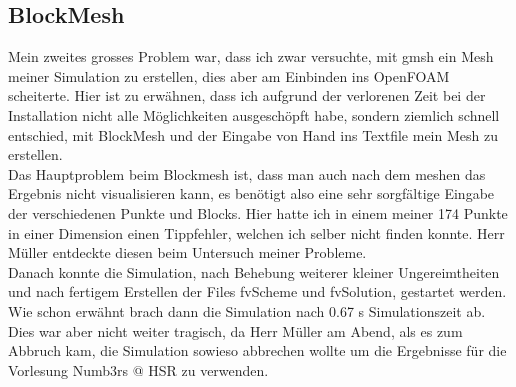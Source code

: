 \begin{refsection}
\subsection{BlockMesh}
Mein zweites grosses Problem war, dass ich zwar versuchte, mit gmsh ein Mesh meiner Simulation zu erstellen, dies aber am Einbinden ins OpenFOAM scheiterte. Hier ist zu erwähnen, dass ich aufgrund der verlorenen Zeit bei der Installation nicht alle Möglichkeiten ausgeschöpft habe, sondern ziemlich schnell entschied, mit BlockMesh und der Eingabe von Hand ins Textfile mein Mesh zu erstellen. \\
Das Hauptproblem beim Blockmesh ist, dass man auch nach dem meshen das Ergebnis nicht visualisieren kann, es benötigt also eine sehr sorgfältige Eingabe der verschiedenen Punkte und Blocks. Hier hatte ich in einem meiner 174 Punkte in einer Dimension einen Tippfehler, welchen ich selber nicht finden konnte. Herr Müller entdeckte diesen beim Untersuch meiner Probleme. \\ Danach konnte die Simulation, nach Behebung weiterer kleiner Ungereimtheiten und nach fertigem Erstellen der Files fvScheme und fvSolution, gestartet werden. Wie schon erwähnt brach dann die Simulation nach 0.67 s Simulationszeit ab. Dies war aber nicht weiter tragisch, da Herr Müller am Abend, als es zum Abbruch kam, die Simulation sowieso abbrechen wollte um die Ergebnisse für die Vorlesung Numb3rs @ HSR zu verwenden.


\end{refsection}

